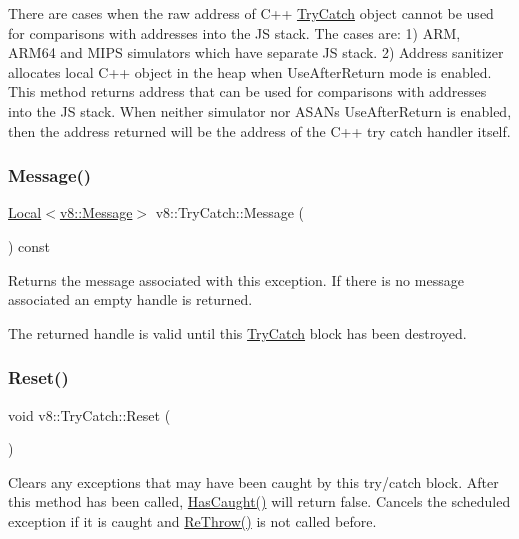 There are cases when the raw address of C++ \mbox{\hyperlink{classv8_1_1TryCatch}{Try\+Catch}} object cannot be used for comparisons with addresses into the JS stack. The cases are\+: 1) A\+RM, A\+R\+M64 and M\+I\+PS simulators which have separate JS stack. 2) Address sanitizer allocates local C++ object in the heap when Use\+After\+Return mode is enabled. This method returns address that can be used for comparisons with addresses into the JS stack. When neither simulator nor A\+S\+AN\textquotesingle{}s Use\+After\+Return is enabled, then the address returned will be the address of the C++ try catch handler itself. \mbox{\label{classv8_1_1TryCatch_a91a41367c87e7a59ada09bcb9aae76c0}} 
\subsubsection{\texorpdfstring{Message()}{Message()}}
{\footnotesize\ttfamily \mbox{\hyperlink{classv8_1_1Local}{Local}}$<$\mbox{\hyperlink{classv8_1_1Message}{v8\+::\+Message}}$>$ v8\+::\+Try\+Catch\+::\+Message (\begin{DoxyParamCaption}{ }\end{DoxyParamCaption}) const}

Returns the message associated with this exception. If there is no message associated an empty handle is returned.

The returned handle is valid until this \mbox{\hyperlink{classv8_1_1TryCatch}{Try\+Catch}} block has been destroyed. \mbox{\label{classv8_1_1TryCatch_a3aae8acab4c99b374b7d782763d4c8e1}} 
\subsubsection{\texorpdfstring{Reset()}{Reset()}}
{\footnotesize\ttfamily void v8\+::\+Try\+Catch\+::\+Reset (\begin{DoxyParamCaption}{ }\end{DoxyParamCaption})}

Clears any exceptions that may have been caught by this try/catch block. After this method has been called, \mbox{\hyperlink{classv8_1_1TryCatch_ab77b36a4adf5681da59abfe43adc4e4e}{Has\+Caught()}} will return false. Cancels the scheduled exception if it is caught and \mbox{\hyperlink{classv8_1_1TryCatch_ab8c3a1dbb38e6fd00e37436034daf707}{Re\+Throw()}} is not called before.

